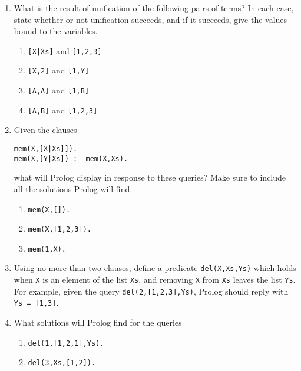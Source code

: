 \documentclass{article}
\begin{document}
\begin{enumerate}
\item
What is the result of unification of the following pairs of terms? In
each case, state whether or not unification succeeds, and if it
succeeds, give the values bound to the variables.  
\begin{enumerate}
\item
\verb![X|Xs]! and \verb![1,2,3]!
\item
\verb![X,2]! and \verb![1,Y]!
\item
\verb![A,A]! and \verb![1,B]!
\item
\verb![A,B]! and \verb![1,2,3]!
\end{enumerate}

\item
Given the clauses
\begin{verbatim}
mem(X,[X|Xs]]).
mem(X,[Y|Xs]) :- mem(X,Xs).
\end{verbatim}
what will Prolog display in response to these queries? Make sure to
include all the solutions Prolog will find.
\begin{enumerate}
\item \verb!mem(X,[]).!
\item \verb!mem(X,[1,2,3]).!
\item \verb!mem(1,X).!
\end{enumerate}

\item
Using no more than two clauses, define a predicate \verb!del(X,Xs,Ys)!
which holds when \verb!X! is an element of the list \verb!Xs!, and
removing \verb!X! from \verb!Xs! leaves the list \verb!Ys!. For
example, given the query \verb!del(2,[1,2,3],Ys)!, Prolog should reply
with \verb!Ys = [1,3]!.

\item
What solutions will Prolog find for the queries
\begin{enumerate}
\item
\verb!del(1,[1,2,1],Ys).!
\item
\verb!del(3,Xs,[1,2]).!
\end{enumerate}


\end{enumerate}
\end{document}
